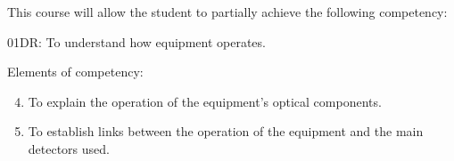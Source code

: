 {This course will allow the student to partially achieve the following competency:

01DR: To understand how equipment operates.

Elements of competency:
\begin{enumerate}
\setcounter{enumi}{3}
\item To explain the operation of the equipment’s optical components.
\item To establish links between the operation of the equipment and the main detectors used.
\end{enumerate}
\smallskip

}
